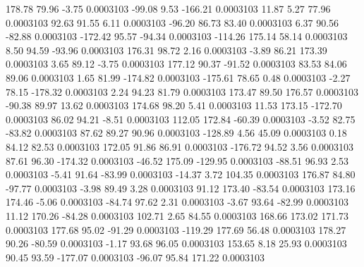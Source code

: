       178.78       79.96       -3.75     0.0003103
      -99.08        9.53     -166.21     0.0003103
       11.87        5.27       77.96     0.0003103
       92.63       91.55        6.11     0.0003103
      -96.20       86.73       83.40     0.0003103
        6.37       90.56      -82.88     0.0003103
     -172.42       95.57      -94.34     0.0003103
     -114.26      175.14       58.14     0.0003103
        8.50       94.59      -93.96     0.0003103
      176.31       98.72        2.16     0.0003103
       -3.89       86.21      173.39     0.0003103
        3.65       89.12       -3.75     0.0003103
      177.12       90.37      -91.52     0.0003103
       83.53       84.06       89.06     0.0003103
        1.65       81.99     -174.82     0.0003103
     -175.61       78.65        0.48     0.0003103
       -2.27       78.15     -178.32     0.0003103
        2.24       94.23       81.79     0.0003103
      173.47       89.50      176.57     0.0003103
      -90.38       89.97       13.62     0.0003103
      174.68       98.20        5.41     0.0003103
       11.53      173.15     -172.70     0.0003103
       86.02       94.21       -8.51     0.0003103
      112.05      172.84      -60.39     0.0003103
       -3.52       82.75      -83.82     0.0003103
       87.62       89.27       90.96     0.0003103
     -128.89        4.56       45.09     0.0003103
        0.18       84.12       82.53     0.0003103
      172.05       91.86       86.91     0.0003103
     -176.72       94.52        3.56     0.0003103
       87.61       96.30     -174.32     0.0003103
      -46.52      175.09     -129.95     0.0003103
      -88.51       96.93        2.53     0.0003103
       -5.41       91.64      -83.99     0.0003103
      -14.37        3.72      104.35     0.0003103
      176.87       84.80      -97.77     0.0003103
       -3.98       89.49        3.28     0.0003103
       91.12      173.40      -83.54     0.0003103
      173.16      174.46       -5.06     0.0003103
      -84.74       97.62        2.31     0.0003103
       -3.67       93.64      -82.99     0.0003103
       11.12      170.26      -84.28     0.0003103
      102.71        2.65       84.55     0.0003103
      168.66      173.02      171.73     0.0003103
      177.68       95.02      -91.29     0.0003103
     -119.29      177.69       56.48     0.0003103
      178.27       90.26      -80.59     0.0003103
       -1.17       93.68       96.05     0.0003103
      153.65        8.18       25.93     0.0003103
       90.45       93.59     -177.07     0.0003103
      -96.07       95.84      171.22     0.0003103

